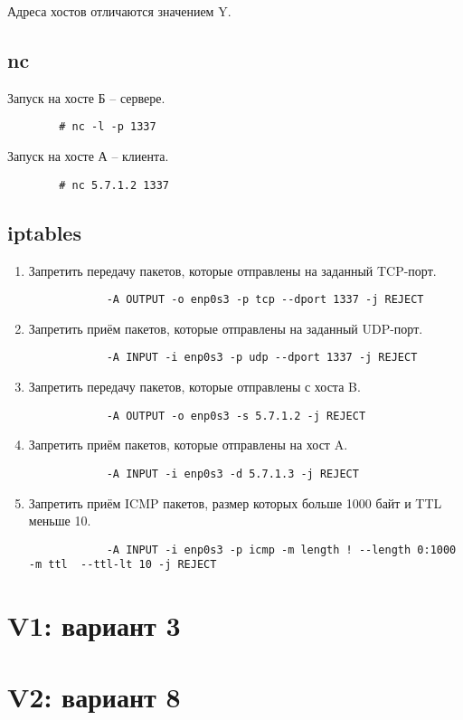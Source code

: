 \documentclass[12pt, a4paper] {ncc}
\begin{document}
    	Адреса хостов отличаются значением Y.

	\subsection*{nc}

		Запуск на хосте Б -- сервере.

\begin{verbatim}
        # nc -l -p 1337
\end{verbatim}

		Запуск на хосте А -- клиента.

\begin{verbatim}
        # nc 5.7.1.2 1337
\end{verbatim}
	
	\subsection*{iptables}

	\begin{enumerate}
		\item Запретить передачу пакетов, которые отправлены на заданный TCP-порт.
            \begin{verbatim}
            -A OUTPUT -o enp0s3 -p tcp --dport 1337 -j REJECT
            \end{verbatim}
		\item Запретить приём пакетов, которые отправлены на заданный UDP-порт.
            \begin{verbatim}
            -A INPUT -i enp0s3 -p udp --dport 1337 -j REJECT
            \end{verbatim}
		\item Запретить передачу пакетов, которые отправлены с хоста B.
            \begin{verbatim}
            -A OUTPUT -o enp0s3 -s 5.7.1.2 -j REJECT
            \end{verbatim}
		\item Запретить приём пакетов, которые отправлены на хост A.
            \begin{verbatim}
            -A INPUT -i enp0s3 -d 5.7.1.3 -j REJECT
            \end{verbatim}
		\item Запретить приём ICMP пакетов, размер которых больше 1000 байт и TTL меньше 10.
            \begin{verbatim}
            -A INPUT -i enp0s3 -p icmp -m length ! --length 0:1000 -m ttl  --ttl-lt 10 -j REJECT
            \end{verbatim}
	\end{enumerate}
	
\section{V1: вариант 3}

\section{V2: вариант 8}
\end{document}
